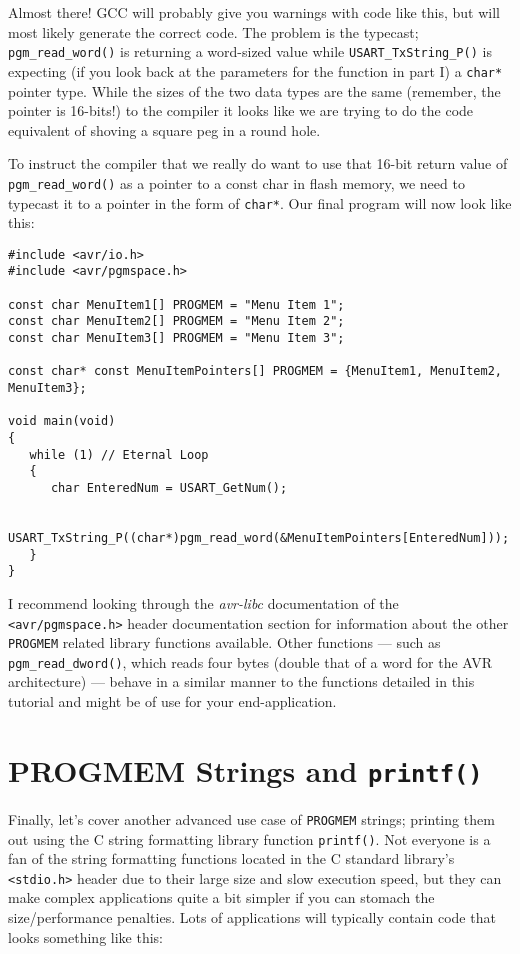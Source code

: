 \documentclass[a4paper,oneside,notitlepage]{book}
\begin{document}
Almost there! GCC will probably give you warnings with code like this, but will most likely generate the correct code. The problem is the typecast; \lstinline{pgm_read_word()} is returning a word-sized value while \lstinline{USART_TxString_P()} is expecting (if you look back at the parameters for the function in part I) a \lstinline{char*} pointer type. While the sizes of the two data types are the same (remember, the pointer is 16-bits!) to the compiler it looks like we are trying to do the code equivalent of shoving a square peg in a round hole.

To instruct the compiler that we really do want to use that 16-bit return value of \lstinline{pgm_read_word()} as a pointer to a const char in flash memory, we need to typecast it to a pointer in the form of \lstinline{char*}. Our final program will now look like this:

\begin{center}
\begin{lstlisting}
#include <avr/io.h>
#include <avr/pgmspace.h>

const char MenuItem1[] PROGMEM = "Menu Item 1";
const char MenuItem2[] PROGMEM = "Menu Item 2";
const char MenuItem3[] PROGMEM = "Menu Item 3";

const char* const MenuItemPointers[] PROGMEM = {MenuItem1, MenuItem2, MenuItem3};

void main(void)
{
   while (1) // Eternal Loop
   {
      char EnteredNum = USART_GetNum();

      USART_TxString_P((char*)pgm_read_word(&MenuItemPointers[EnteredNum]));
   }
}
\end{lstlisting}
\end{center}

I recommend looking through the \textit{avr-libc} documentation of the \lstinline{<avr/pgmspace.h>} header documentation section for information about the other \lstinline{PROGMEM} related library functions available. Other functions --- such as \lstinline{pgm_read_dword()}, which reads four bytes (double that of a word for the AVR architecture) --- behave in a similar manner to the functions detailed in this tutorial and might be of use for your end-application.


\section{PROGMEM Strings and \texttt{printf()}}

Finally, let's cover another advanced use case of \lstinline{PROGMEM} strings; printing them out using the C string formatting library function \lstinline{printf()}. Not everyone is a fan of the string formatting functions located in the C standard library's \lstinline{<stdio.h>} header due to their large size and slow execution speed, but they can make complex applications quite a bit simpler if you can stomach the size/performance penalties. Lots of applications will typically contain code that looks something like this:
\end{document}
